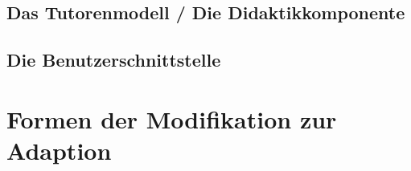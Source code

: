\subsection{Das Tutorenmodell / Die Didaktikkomponente}


\subsection{Die Benutzerschnittstelle}
\section{Formen der Modifikation zur Adaption}
